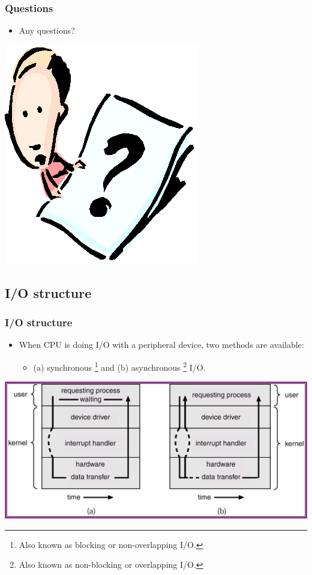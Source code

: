 \documentclass[CJKutf8,xcolor=pdftex,dvipsnames,table]{beamer}
\begin{document}
\begin{CJK*}{UTF8}{song}
  \begin{frame}
    \frametitle{Questions}
    \begin{itemize}
    \item{Any questions?}
    \end{itemize}
    \begin{center}
      \includegraphics[scale=.5]{question}
    \end{center}
  \end{frame}

  \subsection{I/O structure}

\iffalse

  \begin{frame}
    \frametitle{I/O structure} \pause
    \begin{itemize}
    \item{When CPU is doing I/O with a peripheral device, two methods are available:} \pause
      \begin{itemize}
      \item{(a) synchronous \footnote{Also known as blocking or non-overlapping I/O.} \pause and (b) asynchronous \footnote{Also known as non-blocking or overlapping I/O.} I/O.} \pause
      \end{itemize}
    \end{itemize}
    \begin{center}
      \includegraphics[scale=0.4]{v6f2-3}
    \end{center}
  \end{frame}


\end{CJK*}
\end{document}
